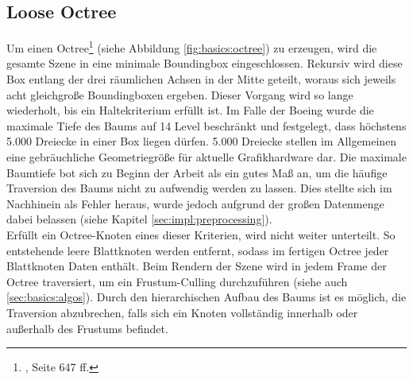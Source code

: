 \subsection{Loose Octree}
\label{sec:basics:octree}
Um einen Octree\footnote{\cite{RTR3}, Seite 647 ff.} (siehe Abbildung \ref{fig:basics:octree}) zu erzeugen, wird die gesamte Szene in eine minimale Boundingbox eingeschlossen. Rekursiv wird diese Box entlang der drei räumlichen Achsen in der Mitte geteilt, woraus sich jeweils acht gleichgroße Boundingboxen ergeben. Dieser Vorgang wird so lange wiederholt, bis ein Haltekriterium erfüllt ist. Im Falle der Boeing wurde die maximale Tiefe des Baums auf 14 Level beschränkt und festgelegt, dass höchstens 5.000 Dreiecke in einer Box liegen dürfen. 5.000 Dreiecke stellen im Allgemeinen eine gebräuchliche Geometriegröße für aktuelle Grafikhardware dar. Die maximale Baumtiefe bot sich zu Beginn der Arbeit als ein gutes Maß an, um die häufige Traversion des Baums nicht zu aufwendig werden zu lassen. Dies stellte sich im Nachhinein als Fehler heraus, wurde jedoch aufgrund der großen Datenmenge dabei belassen (siehe Kapitel \ref{sec:impl:preprocessing}).\\
Erfüllt ein Octree-Knoten eines dieser Kriterien, wird nicht weiter unterteilt. So entstehende leere Blattknoten werden entfernt, sodass im fertigen Octree jeder Blattknoten Daten enthält. Beim Rendern der Szene wird in jedem Frame der Octree traversiert, um ein Frustum-Culling durchzuführen (siehe auch \ref{sec:basics:algos}). Durch den hierarchischen Aufbau des Baums ist es möglich, die Traversion abzubrechen, falls sich ein Knoten vollständig innerhalb oder außerhalb des Frustums befindet.

